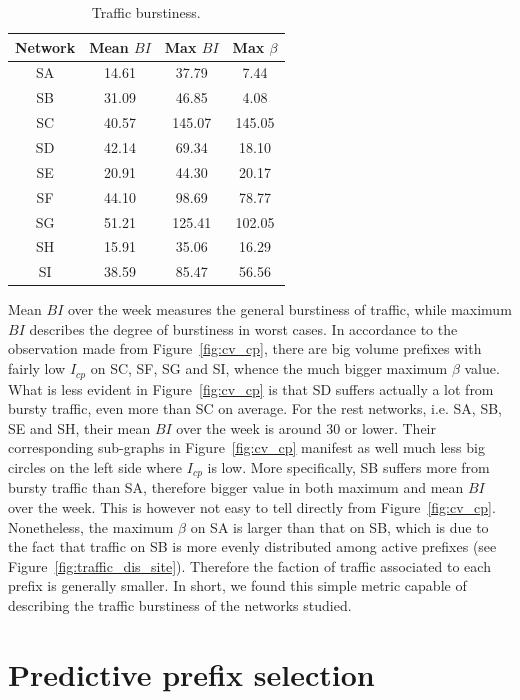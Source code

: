 \begin{table}[!htb]
\centering
\footnotesize
\begin{tabular}{cccc}\toprule
\textbf{Network} & \textbf{Mean $BI$} & \textbf{Max $BI$} & \textbf{Max $\beta$}\\
\midrule
SA & 14.61 & 37.79  &  7.44\\
SB & 31.09 & 46.85  &  4.08\\
SC & 40.57 & 145.07 &  145.05\\
SD & 42.14 & 69.34  &  18.10\\
SE & 20.91 & 44.30  &  20.17\\
SF & 44.10 & 98.69  &  78.77\\
SG & 51.21 & 125.41 &  102.05\\
SH & 15.91 & 35.06  &  16.29\\
SI & 38.59 & 85.47  &  56.56\\
\bottomrule
\end{tabular}
\caption{Traffic burstiness.}
\label{tab:bi}
\end{table}

Mean $BI$ over the week measures the general burstiness of traffic, while maximum $BI$ describes the degree of burstiness in worst cases.
In accordance to the observation made from Figure~\ref{fig:cv_cp}, there are big volume prefixes with fairly low $I_{cp}$ on SC, SF, SG and SI, whence the much bigger maximum $\beta$ value.
What is less evident in Figure~\ref{fig:cv_cp} is that SD suffers actually a lot from bursty traffic, even more than SC on average.
For the rest networks, i.e. SA, SB, SE and SH, their mean $BI$ over the week is around 30 or lower. Their corresponding sub-graphs in Figure~\ref{fig:cv_cp} manifest as well much less big circles on the left side where $I_{cp}$ is low.
More specifically, SB suffers more from bursty traffic than SA, therefore bigger value in both maximum and mean $BI$ over the week.
This is however not easy to tell directly from Figure~\ref{fig:cv_cp}.
Nonetheless, the maximum $\beta$ on SA is larger than that on SB, which is due to the fact that traffic on SB is more evenly distributed among active prefixes (see Figure~\ref{fig:traffic_dis_site}).
Therefore the faction of traffic associated to each prefix is generally smaller.
In short, we found this simple metric capable of describing the traffic burstiness of the networks studied.


\section{Predictive prefix selection}
\label{sec:sele}

